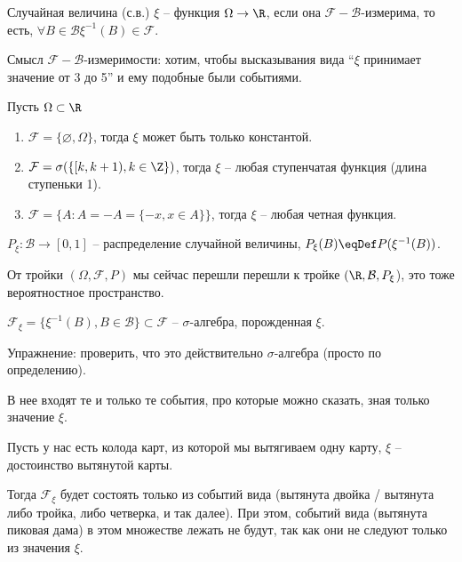 \begin{Def}
Случайная величина (с.в.) $\xi$ -- функция $\Omega \to \R$, если она $\mathcal{F}-\mathcal{B}$-измерима, 
то есть, $\forall B \in \mathcal{B} \xi^{-1}(B) \in \mathcal{F}$.
\end{Def}
\begin{Rem}
Смысл $\mathcal{F}-\mathcal{B}$-измеримости: хотим, чтобы высказывания вида ``$\xi$ принимает значение от 3 до 5'' и ему подобные были событиями.
\end{Rem}
\begin{exmp}
Пусть $\Omega \subset \R$
\begin{enumerate}
\item $\mathcal{F} = \{\varnothing, \Omega\}$, тогда $\xi$ может быть только константой.
\item $\mathcal{F} = \sigma(\{[k, k + 1), k \in \Z\})$, тогда $\xi$ -- любая ступенчатая функция (длина ступеньки 1).
\item $\mathcal{F} = \{A\colon A = -A = \{-x, x \in A\}\}$, тогда $\xi$ -- любая четная функция.
\end{enumerate}
\end{exmp}

\begin{Def}
$P_{\xi}\colon \mathcal{B} \to [0, 1]$ -- распределение случайной величины, $P_{\xi}(B) \eqDef P(\xi^{-1}(B))$.
\end{Def}

От тройки $(\Omega, \mathcal{F}, P)$ мы сейчас перешли перешли к тройке $(\R, \mathcal{B}, P_{\xi}$), это тоже вероятностное пространство.

\begin{Def}
$\mathcal{F}_{\xi} = \{ \xi^{-1}(B), B \in \mathcal{B} \} \subset \mathcal{F}$ -- $\sigma$-алгебра, порожденная $\xi$. 
\end{Def}
Упражнение: проверить, что это действительно $\sigma$-алгебра (просто по определению).
\begin{Rem}
В нее входят те и только те события, про которые можно сказать, зная только значение $\xi$.
\end{Rem}
\begin{exmp}
Пусть у нас есть колода карт, из которой мы вытягиваем одну карту, $\xi$ -- достоинство вытянутой карты.

Тогда $\mathcal{F}_{\xi}$ будет состоять только из событий вида (вытянута двойка / вытянута либо тройка, либо четверка, и так далее).
При этом, событий вида (вытянута пиковая дама) в этом множестве лежать не будут, так как они не следуют только из значения $\xi$.
\end{exmp}


